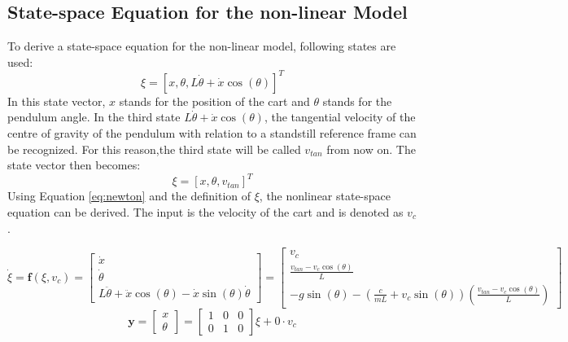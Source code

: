 \documentclass[a4paper,kul]{kulakarticle} %
\begin{document}
\begin{figure}[htp!]
\begin{minipage}{.5\textwidth}
		\label{fig:VLDpendulum}
	\end{minipage}
\end{figure}


\subsection{State-space Equation for the non-linear Model}
To derive a state-space equation for the non-linear model, following states are used:
\begin{equation}
	\xi = [x, \theta, L\dot{\theta} +  \dot{x}\cos(\theta)]^{T}
\end{equation}
In this state vector, $x$ stands for the position of the cart and $\theta$ stands for the pendulum angle. In the third state $L\dot{\theta} +  \dot{x}\cos(\theta)$, the tangential velocity of the centre of gravity of the pendulum with relation to a standstill reference frame can be recognized. For this reason,the third state will be called $v_{tan}$ from now on. The state vector then becomes: 
\begin{equation}
\xi = [x, \theta, v_{tan}]^{T}
\label{eq:xi}
\end{equation}
Using Equation \ref{eq:newton} and the definition of $\xi$, the nonlinear state-space equation can be derived. The input is the velocity of the cart and is denoted as $v_{c}$. 

\begin{equation}
	\dot{\xi} = \mathbf{f}(\xi,v_c) = \begin{bmatrix}
	\dot{x} \\ \dot{\theta} \\ L\ddot{\theta} + \ddot{x}\cos(\theta) - \dot{x}\sin(\theta)\dot{\theta}
	\end{bmatrix} = \begin{bmatrix}
	v_c \\ \frac{v_{tan}-v_c\cos(\theta)}{L} \\ -g\sin(\theta) - (\frac{c}{mL}+v_c\sin(\theta))(\frac{v_{tan} - v_c\cos(\theta)}{L})
	\end{bmatrix}
	\label{eq:nonlinear}
	\end{equation}
	\begin{equation}
	\mathbf{y} 
 = \begin{bmatrix}
	 x\\\theta
 \end{bmatrix} = \begin{bmatrix}
 1&0&0\\0&1&0
 \end{bmatrix}\xi + 0 \cdot v_c
 \label{eq:measurementnonlinear}
 \end{equation}
\end{document}
